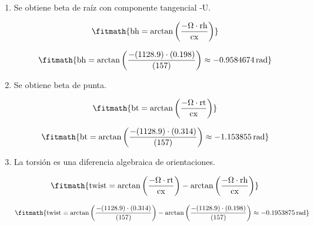 \begin{enumerate}

\item Se obtiene beta de raíz con componente tangencial -U.

\[\fitmath{\mathrm{bh}=\arctan\left(\frac{-\Omega\cdot \mathrm{rh}}{\mathrm{cx}}\right)}\]

\[\fitmath{\mathrm{bh}=\arctan\left(\frac{-(1128.9)\cdot (0.198)}{(157)}\right)\approx -0.9584674\,\mathrm{rad}}\]

\item Se obtiene beta de punta.

\[\fitmath{\mathrm{bt}=\arctan\left(\frac{-\Omega\cdot \mathrm{rt}}{\mathrm{cx}}\right)}\]

\[\fitmath{\mathrm{bt}=\arctan\left(\frac{-(1128.9)\cdot (0.314)}{(157)}\right)\approx -1.153855\,\mathrm{rad}}\]

\item La torsión es una diferencia algebraica de orientaciones.

\[\fitmath{\mathrm{twist}=\arctan\left(\frac{-\Omega\cdot \mathrm{rt}}{\mathrm{cx}}\right)-\arctan\left(\frac{-\Omega\cdot \mathrm{rh}}{\mathrm{cx}}\right)}\]

\[\fitmath{\mathrm{twist}=\arctan\left(\frac{-(1128.9)\cdot (0.314)}{(157)}\right)-\arctan\left(\frac{-(1128.9)\cdot (0.198)}{(157)}\right)\approx -0.1953875\,\mathrm{rad}}\]

\end{enumerate}
